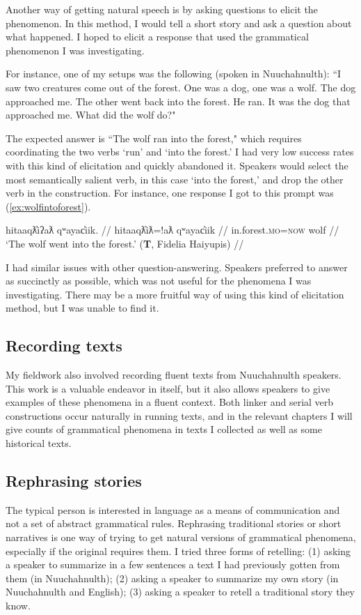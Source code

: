 Another way of getting natural speech is by asking questions to elicit the phenomenon. In this method, I would tell a short story and ask a question about what happened. I hoped to elicit a response that used the grammatical phenomenon I was investigating.

For instance, one of my setups was the following (spoken in Nuuchahnulth): ``I saw two creatures come out of the forest. One was a dog, one was a wolf. The dog approached me. The other went back into the forest. He ran. It was the dog that approached me. What did the wolf do?"

The expected answer is ``The wolf ran into the forest," which requires coordinating the two verbs `run' and `into the forest.' I had very low success rates with this kind of elicitation and quickly abandoned it. Speakers would select the most semantically salient verb, in this case `into the forest,' and drop the other verb in the construction. For instance, one response I got to this prompt was (\ref{ex:wolfintoforest}).

\ex \label{ex:wolfintoforest}
\begingl
\glpreamble hitaaqƛ̓iʔaƛ qʷayac̓iik. //
\gla hitaaqƛ̓iƛ=!aƛ qʷayac̓iik //
\glb in.forest.\textsc{mo}=\textsc{now} wolf //
\glft `The wolf went into the forest.' (\textbf{T}, Fidelia Haiyupis) //
\endgl
\xe

I had similar issues with other question-answering. Speakers preferred to answer as succinctly as possible, which was not useful for the phenomena I was investigating. There may be a more fruitful way of using this kind of elicitation method, but I was unable to find it.

\subsection{Recording texts}

My fieldwork also involved recording fluent texts from Nuuchahnulth speakers. This work is a valuable endeavor in itself, but it also allows speakers to give examples of these phenomena in a fluent context. Both linker and serial verb constructions occur naturally in running texts, and in the relevant chapters I will give counts of grammatical phenomena in texts I collected as well as some historical texts.

\subsection{Rephrasing stories}

The typical person is interested in language as a means of communication and not a set of abstract grammatical rules. Rephrasing traditional stories or short narratives is one way of trying to get natural versions of grammatical phenomena, especially if the original requires them. I tried three forms of retelling: (1) asking a speaker to summarize in a few sentences a text I had previously gotten from them (in Nuuchahnulth); (2) asking a speaker to summarize my own story (in Nuuchahnulth and English); (3) asking a speaker to retell a traditional story they know.

